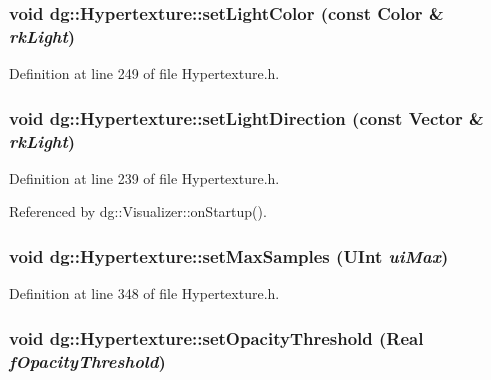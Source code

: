 \subsubsection{\setlength{\rightskip}{0pt plus 5cm}void dg::Hypertexture::set\-Light\-Color (const {\bf Color} \& {\em rk\-Light})\hspace{0.3cm}{\tt  [inline]}}\label{classdg_1_1Hypertexture_a12}




Definition at line 249 of file Hypertexture.h.
\subsubsection{\setlength{\rightskip}{0pt plus 5cm}void dg::Hypertexture::set\-Light\-Direction (const {\bf Vector} \& {\em rk\-Light})\hspace{0.3cm}{\tt  [inline]}}\label{classdg_1_1Hypertexture_a10}




Definition at line 239 of file Hypertexture.h.

Referenced by dg::Visualizer::on\-Startup().
\subsubsection{\setlength{\rightskip}{0pt plus 5cm}void dg::Hypertexture::set\-Max\-Samples ({\bf UInt} {\em ui\-Max})\hspace{0.3cm}{\tt  [inline]}}\label{classdg_1_1Hypertexture_a39}




Definition at line 348 of file Hypertexture.h.
\subsubsection{\setlength{\rightskip}{0pt plus 5cm}void dg::Hypertexture::set\-Opacity\-Threshold ({\bf Real} {\em f\-Opacity\-Threshold})\hspace{0.3cm}{\tt  [inline]}}\label{classdg_1_1Hypertexture_a30}




